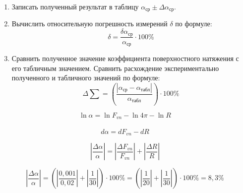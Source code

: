\begin{enumerate}
    \item {Записать полученный результат в таблицу $\alpha _\text{ср} \pm \Delta \alpha _\text{ср}$.}
    \item {
        Вычислить относительную погрешность измерений {$\delta$} по формуле:
        \begin{equation*}
            \delta = \frac{\delta \alpha _ \text{ср}}{\alpha _ \text{ср}} \cdot 100\% 
        \end{equation*}
    }
    \item {
        Сравнить полученное значение коэффициента поверхностного натяжения с его табличным значением. Сравнить расхождение экспериментально полученного и табличного значений по формуле:
        \begin{equation*}
            \Delta \sum =  \left(\frac{| \alpha _\text{ср} - \alpha _\text{табл}|}{\alpha _\text{табл}} \right) \cdot 100\%
        \end{equation*}
    }
\end{enumerate}
    
\[\ln{\alpha}=\ln{F_{vn}} - \ln{4\pi} - \ln{R}\]\
\[d\alpha= d F_{vn} - d R\]

\[|\frac{\Delta \alpha}{\alpha}| = |\frac{\Delta F_{vn}}{F_{vn}}| + |\frac{\Delta R}{R}|\]

\[|\frac{\Delta \alpha}{\alpha}| = (|\frac{0,001}{0,02}| + |\frac{1}{30}|) \cdot 100 \% = (|\frac{1}{20}| + |\frac{1}{30}|) \cdot 100 \% = 8,3 \%\]

